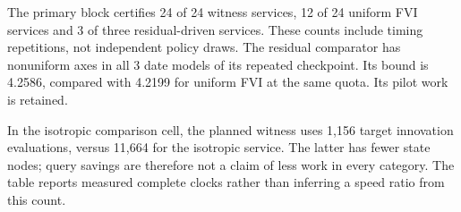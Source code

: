The primary block certifies 24 of 24 witness services, 12 of 24 uniform FVI services and 3 of three residual-driven services. These counts include timing repetitions, not independent policy draws. The residual comparator has nonuniform axes in all 3 date models of its repeated checkpoint. Its bound is 4.2586, compared with 4.2199 for uniform FVI at the same quota. Its pilot work is retained.

In the isotropic comparison cell, the planned witness uses 1,156 target innovation evaluations, versus 11,664 for the isotropic service. The latter has fewer state nodes; query savings are therefore not a claim of less work in every category. The table reports measured complete clocks rather than inferring a speed ratio from this count.

